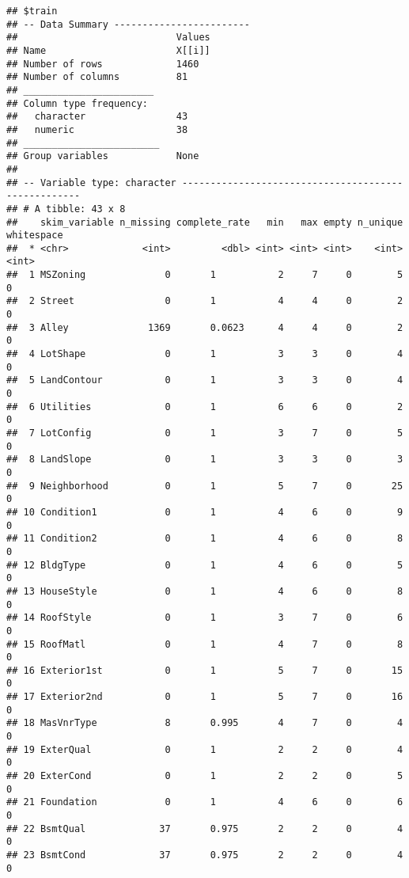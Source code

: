 \documentclass[
]{article}
\begin{document}
\begin{verbatim}
## $train
## -- Data Summary ------------------------
##                            Values
## Name                       X[[i]]
## Number of rows             1460  
## Number of columns          81    
## _______________________          
## Column type frequency:           
##   character                43    
##   numeric                  38    
## ________________________         
## Group variables            None  
## 
## -- Variable type: character ----------------------------------------------------
## # A tibble: 43 x 8
##    skim_variable n_missing complete_rate   min   max empty n_unique whitespace
##  * <chr>             <int>         <dbl> <int> <int> <int>    <int>      <int>
##  1 MSZoning              0       1           2     7     0        5          0
##  2 Street                0       1           4     4     0        2          0
##  3 Alley              1369       0.0623      4     4     0        2          0
##  4 LotShape              0       1           3     3     0        4          0
##  5 LandContour           0       1           3     3     0        4          0
##  6 Utilities             0       1           6     6     0        2          0
##  7 LotConfig             0       1           3     7     0        5          0
##  8 LandSlope             0       1           3     3     0        3          0
##  9 Neighborhood          0       1           5     7     0       25          0
## 10 Condition1            0       1           4     6     0        9          0
## 11 Condition2            0       1           4     6     0        8          0
## 12 BldgType              0       1           4     6     0        5          0
## 13 HouseStyle            0       1           4     6     0        8          0
## 14 RoofStyle             0       1           3     7     0        6          0
## 15 RoofMatl              0       1           4     7     0        8          0
## 16 Exterior1st           0       1           5     7     0       15          0
## 17 Exterior2nd           0       1           5     7     0       16          0
## 18 MasVnrType            8       0.995       4     7     0        4          0
## 19 ExterQual             0       1           2     2     0        4          0
## 20 ExterCond             0       1           2     2     0        5          0
## 21 Foundation            0       1           4     6     0        6          0
## 22 BsmtQual             37       0.975       2     2     0        4          0
## 23 BsmtCond             37       0.975       2     2     0        4          0

\end{verbatim}
\end{document}
